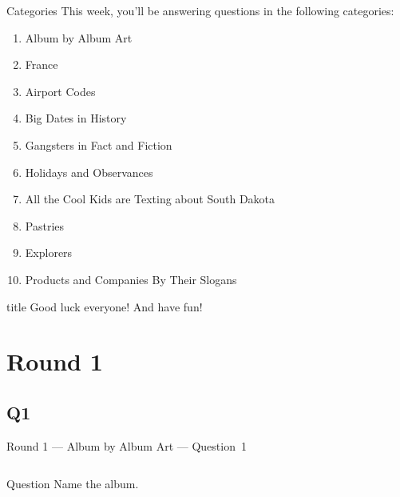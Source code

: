 \documentclass[11pt]{beamer}
\begin{document}
\begingroup{}
\begin{frame}[t]{Categories}
This week, you'll be answering questions in the following categories:
\begin{enumerate}
\item Album by Album Art
\item France
\item Airport Codes
\item Big Dates in History
\item Gangsters in Fact and Fiction
\item Holidays and Observances
\item All the Cool Kids are Texting about South Dakota
\item Pastries
\item Explorers
\item Products and Companies By Their Slogans
\end{enumerate}
\end{frame}
\endgroup{}

\begingroup{}
\begin{frame}
\vfill{}
\begin{beamercolorbox}[sep=8pt,center,shadow=true,rounded=true]{title}
Good luck everyone! And have fun!
\end{beamercolorbox}
\vfill{}
\end{frame}
\endgroup{}
\def\thisSectionName{Album by Album Art}
\section{Round 1}
\subsection*{Q1}
\begin{frame}[t]{Round 1 --- Album by Album Art --- \mbox{Question 1}}
\begin{columns}[T,totalwidth=\linewidth]
\begin{column}{0.32\linewidth}
\begin{block}{Question}
Name the album.
\end{block}
\end{column}
\begin{column}{0.65\linewidth}
\begin{center}
\texttt{[image: \{Images/harddaysnight]}.jpeg}
\end{center}
\end{column}
\end{columns}
\end{frame}
\end{document}
